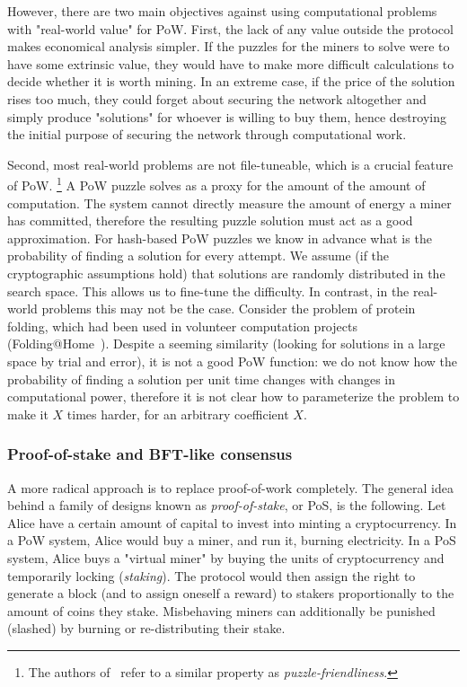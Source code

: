 However, there are two main objectives against using computational problems with "real-world value" for PoW.
First, the lack of any value outside the protocol makes economical analysis simpler.
If the puzzles for the miners to solve were to have some extrinsic value, they would have to make more difficult calculations to decide whether it is worth mining.
In an extreme case, if the price of the solution rises too much, they could forget about securing the network altogether and simply produce "solutions" for whoever is willing to buy them, hence destroying the initial purpose of securing the network through computational work.

Second, most real-world problems are not file-tuneable, which is a crucial feature of PoW.
\footnote{The authors of~\cite{Narayanan2016} refer to a similar property as \textit{puzzle-friendliness}.}
A PoW puzzle solves as a proxy for the amount of the amount of computation.
The system cannot directly measure the amount of energy a miner has committed, therefore the resulting puzzle solution must act as a good approximation.
For hash-based PoW puzzles we know in advance what is the probability of finding a solution for every attempt.
We assume (if the cryptographic assumptions hold) that solutions are randomly distributed in the search space.
This allows us to fine-tune the difficulty.
In contrast, in the real-world problems this may not be the case.
Consider the problem of protein folding, which had been used in volunteer computation projects (Folding@Home~\cite{Beberg2009}).
Despite a seeming similarity (looking for solutions in a large space by trial and error), it is not a good PoW function: we do not know how the probability of finding a solution per unit time changes with changes in computational power, therefore it is not clear how to parameterize the problem to make it $X$ times harder, for an arbitrary coefficient $X$.


\subsubsection*{Proof-of-stake and BFT-like consensus}

A more radical approach is to replace proof-of-work completely.
The general idea behind a family of designs known as \textit{proof-of-stake}, or PoS, is the following.
Let Alice have a certain amount of capital to invest into minting a cryptocurrency.
In a PoW system, Alice would buy a miner, and run it, burning electricity.
In a PoS system, Alice buys a "virtual miner" by buying the units of cryptocurrency and temporarily locking (\textit{staking}).
The protocol would then assign the right to generate a block (and to assign oneself a reward) to stakers proportionally to the amount of coins they stake.
Misbehaving miners can additionally be punished (slashed) by burning or re-distributing their stake.

